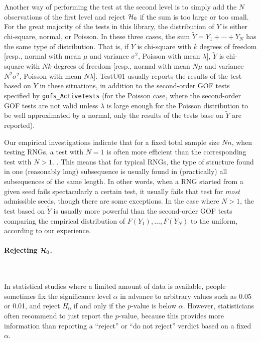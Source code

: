 Another way of performing the test at the second level is to simply add
the $N$ observations of the first level
and reject $\mathcal{H}_0$ if the sum is too large or too small.
For the great majority of the tests in this library, the distribution
of $Y$ is either chi-square, normal, or Poisson.
In these three cases, the sum $\tilde Y = Y_1 + \cdots + Y_N$ has the
same type of distribution.  That is, if $Y$ is chi-square with $k$ degrees
of freedom [resp., normal with mean $\mu$ and variance $\sigma^2$,
Poisson with mean $\lambda$], $\tilde Y$ is chi-square with $Nk$ degrees
of freedom [resp., normal with mean $N\mu$ and variance $N^2\sigma^2$,
Poisson with mean $N\lambda$].
TestU01 usually
reports the results of the test based on $\tilde Y$ in
these situations, in addition to the second-order GOF tests specified
by {\tt gofs\_ActiveTests} (for the Poisson case, where the
second-order GOF tests are not valid unless $\lambda$ is large enough
for the Poisson distribution to be well approximated by a normal,
only the results of the tests base on $\tilde Y$ are reported).

Our empirical investigations indicate that for a fixed total
sample size $Nn$, when testing RNGs, a test with $N=1$ is often
more efficient than the corresponding test with $N > 1$.
.
This means that for typical RNGs, the type of structure found in
one (reasonably long) subsequence is usually found in (practically)
all subsequences of the same length.
In other words, when a RNG started from a
given seed fails spectacularly a certain test, it usually fails
that test for {\em most\/} admissible seeds, though
there are some exceptions.
In the case where $N > 1$, the test based on $\tilde Y$ is usually
more powerful than the second-order GOF tests comparing the empirical
distribution of $F(Y_1),\dots,F(Y_N)$ to the uniform,
according to our experience.


\paragraph*{Rejecting $\mathcal{H}_0$.} \

In statistical studies where a limited amount of data is available,
people sometimes fix the significance level $\alpha$ in advance
to arbitrary values such as 0.05 or 0.01,
and reject $H_0$ if and only if the $p$-value is below $\alpha$.
However, statisticians often recommend to just report the $p$-value,
because this provides more information than reporting a ``reject'' or
``do not reject'' verdict based on a fixed $\alpha$.

